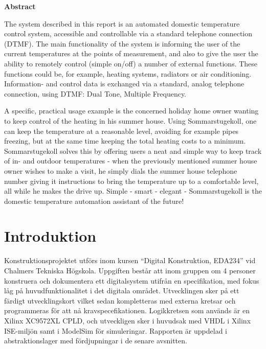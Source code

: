 \documentclass[a4paper,11pt]{article}
\begin{document}
\begin{center}
	{\noindent \bf Abstract}
\end{center}

	The system described in this report is an automated domestic temperature control system, accessible and controllable via
	a standard telephone connection (DTMF). The main functionality of the system is informing the user of the current temperatures
	at the points of measurement, and also to give the user the ability to remotely control (simple on/off) a number of external
	functions. These functions could be, for example, heating systems, radiators or air conditioning. Information- and control data
	is exchanged via a standard, analog telephone connection, using DTMF: Dual Tone, Multiple Frequency.

	A specific, practical usage example is the concerned holiday home owner wanting to keep control of the heating in his summer house.
	Using Sommarstugekoll, one can keep the temperature at a reasonable level, avoiding for example pipes freezing, but at the same time
	keeping the total heating costs to a minimum. Sommarstugekoll solves this by offering users a neat and simple way to keep track
	of in- and outdoor temperatures - when the previously mentioned summer house owner wishes to make a visit, he simply dials the
	summer house telephone number giving it instructions to bring the temperature up to a comfortable level, all while he makes
	the drive up. Simple - smart - elegant - Sommarstugekoll is the domestic temperature automation assistant of the future!
 \thispagestyle{empty}
\pagebreak

\setcounter{page}{1}
\section{Introduktion}

	Konstruktionsprojektet utförs inom kursen ``Digital Konstruktion, EDA234'' vid Chalmers Tekniska Högskola. Uppgiften består att inom gruppen om 4 personer konstruera och dokumentera
	ett digitalsystem utifrån en specifikation, med fokus låg på huvudfunktionalitet i det digitala området. Utvecklingen sker på ett färdigt utvecklingskort vilket sedan kompletteras med externa kretsar och programmeras för att nå kravspecefikationen. Logikkretsen som används är en Xilinx XC9572XL CPLD, och utveckligen sker i huvudsak med VHDL i Xilinx ISE-miljön samt i ModelSim för simuleringar. Rapporten är uppdelad i abstraktionslager med fördjupningar i de senare avsnitten. 
\end{document}
